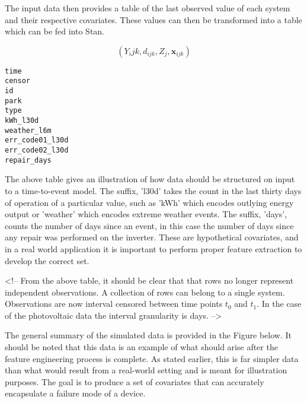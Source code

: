 The input data then provides a table of the last observed value of each system and their respective covariates. These values can then be transformed into a table which can be fed into Stan. 



$$ (Y_ijk, d_{ijk}, Z_j,  \textbf{x}_{ijk}) $$


\begin{lstlisting}
time	
censor	
id	
park	
type	
kWh_l30d	
weather_l6m	
err_code01_l30d	
err_code02_l30d	
repair_days
\end{lstlisting}

The above table gives an illustration of how data should be structured on input to a time-to-event model. The suffix, 'l30d' takes the count in the last thirty days of operation of a particular value, such as 'kWh' which encodes outlying energy output or 'weather' which encodes extreme weather events. The suffix, 'days', counts the number of days since an event, in this case the number of days since any repair was performed on the inverter. These are hypothetical covariates, and in a real world application it is important to perform proper feature extraction to develop the correct set.

<!-- From the above table, it should be clear that that rows no longer represent independent observations. A collection of rows can belong to a single system. Observations are now interval censored between time points $t_0$ and $t_1$. In the case of the photovoltaic data the interval granularity is days. -->

The general summary of the simulated data is provided in the Figure below. It should be noted that this data is an example of what should arise after the feature engineering process is complete. As stated earlier, this is far simpler data than what would result from a real-world setting and is meant for illustration purposes. The goal is to produce a set of covariates that can accurately encapsulate a failure mode of a device.



